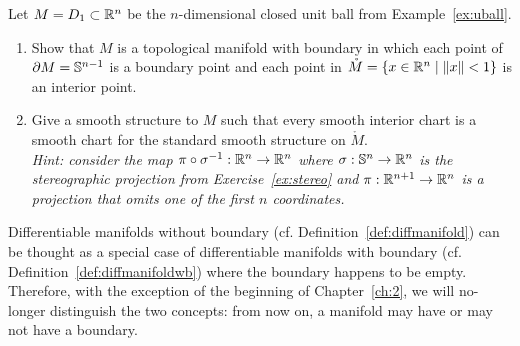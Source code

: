 \begin{exercise}[\textit{[homework 1]}]
  Let $M = D_1\subset \mathbb{R}^n$ be the $n$-dimensional closed unit ball from Example~\ref{ex:uball}.
  \begin{enumerate}
    \item Show that $M$ is a topological manifold with boundary in which each point of $\partial M = \mathbb{S}^{n-1}$ is a boundary point and each point in $\mathring M = \{x\in\mathbb{R}^n\mid\|x\|<1\}$ is an interior point.
    \item Give a smooth structure to $M$ such that every smooth interior chart is a smooth chart for the standard smooth structure on $\mathring M$.\\
    \textit{\small Hint: consider the map $\pi\circ\sigma^{-1}:\mathbb{R}^n\to\mathbb{R}^n$ where $\sigma:\mathbb{S}^n\to\mathbb{R}^n$ is the stereographic projection from Exercise~\ref{ex:stereo} and $\pi:\mathbb{R}^{n+1}\to\mathbb{R}^n$ is a projection that omits one of the first $n$ coordinates.}
  \end{enumerate}
\end{exercise}

\begin{tcolorbox}
  Differentiable manifolds without boundary (cf. Definition~\ref{def:diffmanifold}) can be thought as a special case of differentiable manifolds with boundary (cf. Definition~\ref{def:diffmanifoldwb}) where the boundary happens to be empty.
  Therefore, with the exception of the beginning of Chapter~\ref{ch:2}, we will no-longer distinguish the two concepts: from now on, a manifold may have or may not have a boundary.
\end{tcolorbox}